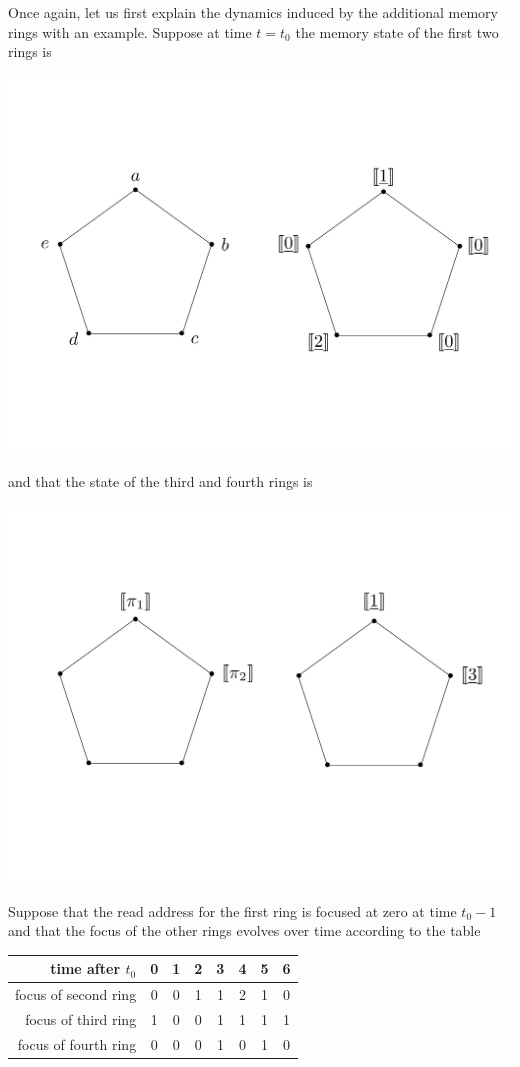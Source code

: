 Once again, let us first explain the dynamics induced by the additional memory rings with an example. Suppose at time $t = t_0$ the memory state of the first two rings is
\begin{center}
\includegraphics[scale=0.3]{dia2}
\end{center}
and that the state of the third and fourth rings is
\begin{center}
\includegraphics[scale=0.3]{dia3}
\end{center}
Suppose that the read address for the first ring is focused at zero at time $t_0 -1$ and that the focus of the other rings evolves over time according to the table
\begin{center}
\begin{tabular}{|r|c|c|c|c|c|c|c|}
\hline
time after $t_0$ & 0 & 1 & 2 & 3 & 4 & 5 & 6\\
\hline
focus of second ring & 0 & 0 & 1 & 1 & 2 & 1 & 0\\
\hline
focus of third ring & 1 & 0 & 0 & 1 & 1 & 1 & 1\\
\hline
focus of fourth ring & 0 & 0 & 0 & 1 & 0 & 1 & 0\\
\hline
\end{tabular}
\end{center}
